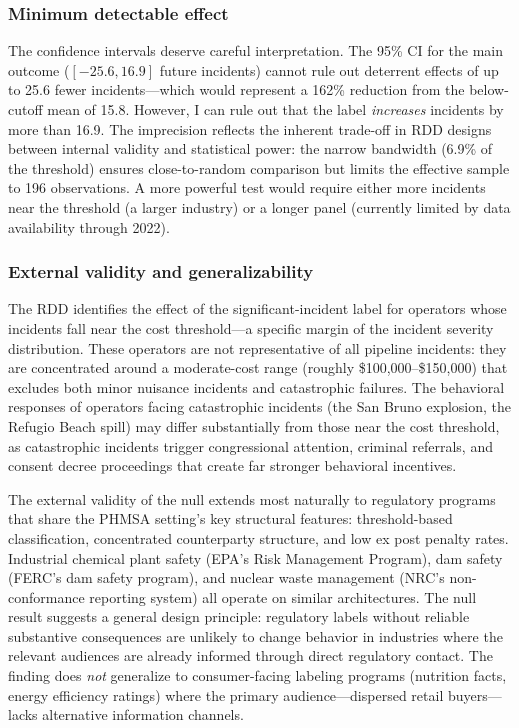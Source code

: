 \documentclass[12pt]{article}
\begin{document}
\subsubsection*{Minimum detectable effect} The confidence intervals deserve careful interpretation. The 95\% CI for the main outcome ($[-25.6, 16.9]$ future incidents) cannot rule out deterrent effects of up to 25.6 fewer incidents---which would represent a 162\% reduction from the below-cutoff mean of 15.8. However, I can rule out that the label \textit{increases} incidents by more than 16.9. The imprecision reflects the inherent trade-off in RDD designs between internal validity and statistical power: the narrow bandwidth (6.9\% of the threshold) ensures close-to-random comparison but limits the effective sample to 196 observations. A more powerful test would require either more incidents near the threshold (a larger industry) or a longer panel (currently limited by data availability through 2022).

\subsubsection*{External validity and generalizability} The RDD identifies the effect of the significant-incident label for operators whose incidents fall near the cost threshold---a specific margin of the incident severity distribution. These operators are not representative of all pipeline incidents: they are concentrated around a moderate-cost range (roughly \$100,000--\$150,000) that excludes both minor nuisance incidents and catastrophic failures. The behavioral responses of operators facing catastrophic incidents (the San Bruno explosion, the Refugio Beach spill) may differ substantially from those near the cost threshold, as catastrophic incidents trigger congressional attention, criminal referrals, and consent decree proceedings that create far stronger behavioral incentives.

The external validity of the null extends most naturally to regulatory programs that share the PHMSA setting's key structural features: threshold-based classification, concentrated counterparty structure, and low ex post penalty rates. Industrial chemical plant safety (EPA's Risk Management Program), dam safety (FERC's dam safety program), and nuclear waste management (NRC's non-conformance reporting system) all operate on similar architectures. The null result suggests a general design principle: regulatory labels without reliable substantive consequences are unlikely to change behavior in industries where the relevant audiences are already informed through direct regulatory contact. The finding does \textit{not} generalize to consumer-facing labeling programs (nutrition facts, energy efficiency ratings) where the primary audience---dispersed retail buyers---lacks alternative information channels.
\end{document}
